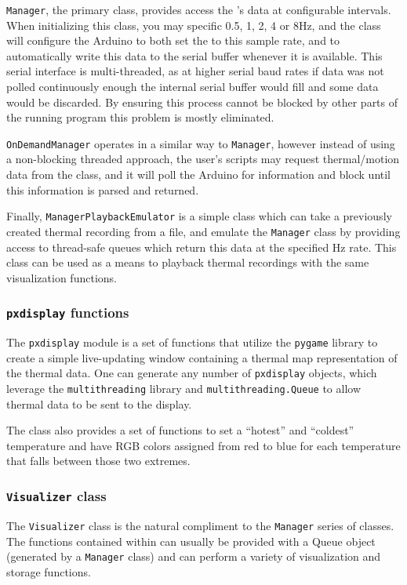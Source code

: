 \documentclass[../thesis/thesis.tex]{subfiles}
\begin{document}
\texttt{Manager}, the primary class, provides access the \mlx's data at configurable intervals. When initializing this class, you may specific 0.5, 1, 2, 4 or 8Hz, and the class will configure the Arduino to both set the \mlx to this sample rate, and to automatically write this data to the serial buffer whenever it is available. This serial interface is multi-threaded, as at higher serial baud rates if data was not polled continuously enough the internal serial buffer would fill and some data would be discarded. By ensuring this process cannot be blocked by other parts of the running program this problem is mostly eliminated. 

\texttt{OnDemandManager} operates in a similar way to \texttt{Manager}, however instead of using a non-blocking threaded approach, the user's scripts may request thermal/motion data from the class, and it will poll the Arduino for information and block until this information is parsed and returned.

Finally, \texttt{ManagerPlaybackEmulator} is a simple class which can take a previously created thermal recording from a file, and emulate the \texttt{Manager} class by providing access to thread-safe queues which return this data at the specified Hz rate. This class can be used as a means to playback thermal recordings with the same visualization functions.

\subsubsection*{\texttt{pxdisplay} functions}

The \texttt{pxdisplay} module is a set of functions that utilize the \texttt{pygame} library to create a simple live-updating window containing a thermal map representation of the thermal data. One can generate any number of \texttt{pxdisplay} objects, which leverage the \texttt{multithreading} library and \texttt{multithreading.Queue} to allow thermal data to be sent to the display.

The class also provides a set of functions to set a ``hotest'' and ``coldest'' temperature and have RGB colors assigned from red to blue for each temperature that falls between those two extremes.

\subsubsection*{\texttt{Visualizer} class}
The \texttt{Visualizer} class is the natural compliment to the \texttt{Manager} series of classes. The functions contained within can usually be provided with a Queue object (generated by a \texttt{Manager} class) and can perform a variety of visualization and storage functions.
\end{document}
